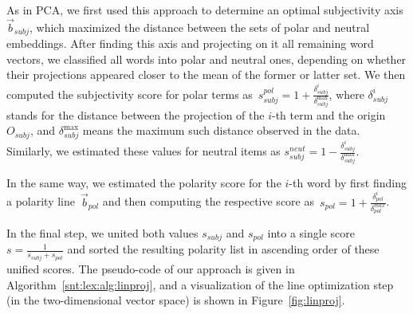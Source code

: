 
As in PCA, we first used this approach to determine an optimal
subjectivity axis $\vec{b}_{subj}$, which maximized the distance
between the sets of polar and neutral embeddings.  After finding this
axis and projecting on it all remaining word vectors, we classified
all words into polar and neutral ones, depending on whether their
projections appeared closer to the mean of the former or latter set.
We then computed the subjectivity score for polar terms
as~$s^{pol}_{subj} = 1 +
\frac{\delta_{subj}^i}{\delta_{subj}^{\max}}$, where $\delta_{subj}^i$
stands for the distance between the projection of the $i$-th term and
the origin $O_{subj}$, and $\delta_{subj}^{\max}$ means the maximum
such distance observed in the data. Similarly, we estimated these
values for neutral items as $s^{neut}_{subj} = 1 -
\frac{\delta_{subj}^i}{\delta_{subj}^{\max}}$.

In the same way, we estimated the polarity score for the $i$-th word
by first finding a polarity line~$\vec{b}_{pol}$ and then computing
the respective score as~$s_{pol} = 1 +
\frac{\delta^i_{pol}}{\delta^{max}_{pol}}$.

In the final step, we united both values $s_{subj}$ and $s_{pol}$ into
a single score $s = \frac{1}{s_{subj} + s_{pol}}$ and sorted the
resulting polarity list in ascending order of these unified scores.
The pseudo-code of our approach is given in
Algorithm~\ref{snt:lex:alg:linproj}, and a visualization of the line
optimization step (in the two-dimensional vector space) is shown in
Figure~\ref{fig:linproj}.

